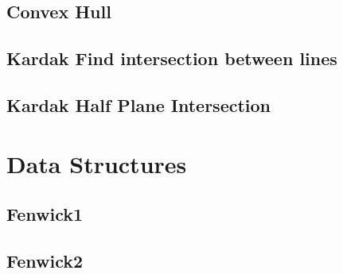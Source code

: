 \documentclass[a4paper,landscape]{article}
\begin{document}
\begin{multicols}{2}
\subsection{Convex Hull}
    
\subsection{Kardak Find intersection between lines}
	
\subsection{Kardak Half Plane Intersection}
	


\section{Data Structures}
\subsection{Fenwick1}
	
\subsection{Fenwick2}
	

\end{multicols}
\end{document}
